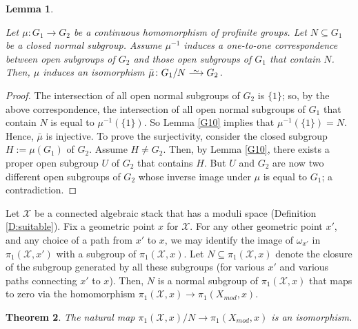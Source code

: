 \documentclass{amsart}
\newtheorem{thm}{Theorem}[section]
\newtheorem{lem}[thm]{Lemma}
\theoremstyle{definition}
\theoremstyle{remark}
\theoremstyle{remark}
\newcommand{\X}{\mathcal{X}}
\newcommand{\Xm}{X_{mod}}
\newcommand{\pX}{\pi_1(\X,x)}
\newcommand{\pXm}{\pi_1(\Xm,x)}
\def\smashedlongrightarrow{\setbox0=\hbox{$\longrightarrow$}\ht0=1pt\box0}
\def\risom{\buildrel\sim\over{\smashedlongrightarrow}}
\let\:=\colon
\begin{document}
\begin{lem}{\label{G10.5}}

Let $\mu \: G_1 \to G_2$ be a continuous homomorphism of profinite
groups. Let $N \subseteq G_1$ be a closed normal subgroup. Assume
$\mu^{-1}$ induces a one-to-one correspondence between open
subgroups of $G_2$ and those open subgroups of $G_1$ that contain
$N$. Then,  $\mu$ induces an isomorphism $\bar{\mu} \: G_1/N
\risom G_2$.
\end{lem}

\begin{proof}

The intersection of all open normal subgroups of $G_2$ is $\{ 1
\}$; so, by the above correspondence, the intersection of all open
normal subgroups of $G_1$ that contain $N$ is equal to
$\mu^{-1}(\{1\})$. So Lemma \ref{G10} implies that
$\mu^{-1}(\{1\})=N$. Hence, $\bar{\mu}$ is injective. To prove the
surjectivity, consider the closed subgroup $H:=\mu (G_1)$ of
$G_2$. Assume $H \neq G_2$. Then, by Lemma \ref{G10}, there exists
a proper open subgroup $U$ of $G_2$ that contains $H$. But $U$ and
$G_2$ are now two different open subgroups of $G_2$ whose inverse
image under $\mu$ is equal to $G_1$; a contradiction.
\end{proof}

Let $\X$ be a connected algebraic stack that has a moduli space
(Definition \ref{D:suitable}). Fix a geometric point $x$ for $\X$.
For any other geometric point $x'$, and any choice of a path from
$x'$ to $x$, we may identify the image of $\omega_{x'}$ in
$\pi_1(\X,x')$ with a subgroup of $\pX$. Let $N \subseteq \pX$
denote the closure of the subgroup generated by all these
subgroups (for various $x'$ and various paths connecting $x'$ to
$x$). Then, $N$ is a normal subgroup of $\pX$ that maps to zero
via the homomorphism $\pX \to \pi_1(\Xm,x)$.

\begin{thm}{\label{G5}}
 The natural map $\pX/N \to \pXm$ is an isomorphism.
\end{thm}
\end{document}
